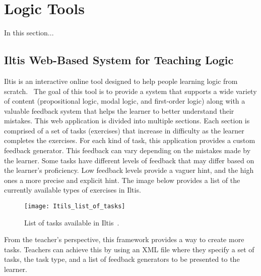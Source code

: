 
%

\chapter{Logic Tools}

In this section...

\section{Iltis Web-Based System for Teaching Logic}
\label{chap:iltis}
Iltis is an interactive online tool designed to help people learning logic from scratch.~\cite{arxivIltisLearning, arxiv} The goal of this tool is to provide a system that supports a wide variety of content (propositional logic, modal logic, and first-order logic) along with a valuable feedback system that helps the learner to better understand their mistakes. This web application is divided into multiple sections. Each section is comprised of a set of tasks (exercises) that increase in difficulty as the learner completes the exercises. For each kind of task, this application provides a custom feedback generator. This feedback can vary depending on the mistakes made by the learner. Some tasks have different levels of feedback that may differ based on the learner’s proficiency. Low feedback levels provide a vaguer hint, and the high ones a more precise and explicit hint. The image below provides a list of the currently available types of exercises in Iltis.

\begin{figure}[htbp]
    \centering
    \texttt{[image: Itils\_list\_of\_tasks]}
    \caption{List of tasks available in Iltis~\cite{arxiv}.}
\end{figure}

From the teacher’s perspective, this framework provides a way to create more tasks. Teachers can achieve this by using an XML file where they specify a set of tasks, the task type, and a list of feedback generators to be presented to the learner.

